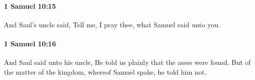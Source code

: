 		\paragraph{1 Samuel 10:15} %
			\label{1SAMUEL-10-15}

			And Saul’s uncle said, Tell me, I pray thee, what Samuel said unto you.


		\paragraph{1 Samuel 10:16} %
			\label{1SAMUEL-10-16}

			And Saul said unto his uncle, He told us plainly that the asses were found. But of the matter of the kingdom, whereof Samuel spake, he told him not.


